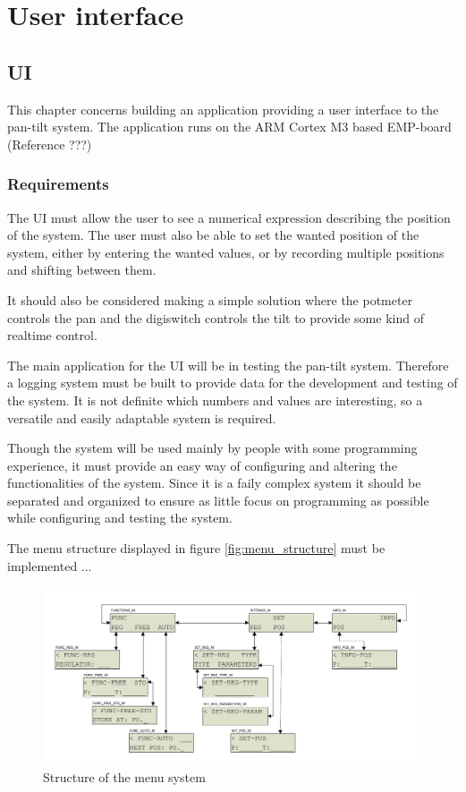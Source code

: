 \chapter{User interface}\label{chap:ui}

\section{UI}
This chapter concerns building an application providing a user interface to the
pan-tilt system. The application runs on the ARM Cortex M3 based EMP-board
(Reference ???)

\subsection{Requirements}
The UI must allow the user to see a numerical expression
describing the position of the system. The user must also be able to set the
wanted position of the system, either by entering the wanted values, or by
recording multiple positions and shifting between them.

It should also be considered making a simple solution where the potmeter
controls the pan and the digiswitch controls the tilt to provide some kind of
realtime control.

The main application for the UI will be in testing the pan-tilt system.
Therefore a logging system must be built to provide data for the development
and testing of the system. It is not definite which numbers and values are
interesting, so a versatile and easily adaptable system is required.

Though the system will be used mainly by people with some programming
experience, it must provide an easy way of configuring and altering the functionalities of the system. Since it is a faily complex system it should be separated and organized to ensure as little focus on programming as possible while configuring and testing the system.

The  menu structure displayed in figure \ref{fig:menu_structure} must be implemented ...

\begin{figure}[htb]
	\centering
	\includegraphics[scale=1,trim=0 0 0 0]{graphics/menu_structure.pdf} 
	\caption{Structure of the menu system}
	\label{fig:ui_task_diagram}
\end{figure}

